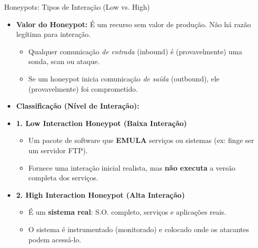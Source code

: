 \begin{frame}{Honeypots: Tipos de Interação (Low vs. High)}
    \begin{itemize}
        \item \textbf{Valor do Honeypot:} É um recurso sem valor de produção. Não há razão legítima para interação.
              \begin{itemize}
                  \item Qualquer comunicação \textit{de entrada} (inbound) é (provavelmente) uma sonda, scan ou ataque.
                  \item Se um honeypot inicia comunicação \textit{de saída} (outbound), ele (provavelmente) foi comprometido.
              \end{itemize}

        \item \textbf{Classificação (Nível de Interação):}

        \item \textbf{1. Low Interaction Honeypot (Baixa Interação)}
              \begin{itemize}
                  \item Um pacote de software que \textbf{EMULA} serviços ou sistemas (ex: finge ser um servidor FTP).
                  \item Fornece uma interação inicial realista, mas \textbf{não executa} a versão completa dos serviços.
              \end{itemize}

        \item \textbf{2. High Interaction Honeypot (Alta Interação)}
              \begin{itemize}
                  \item É um \textbf{sistema real}: S.O. completo, serviços e aplicações reais.
                  \item O sistema é instrumentado (monitorado) e colocado onde os atacantes podem acessá-lo.
              \end{itemize}
    \end{itemize}
\end{frame}

